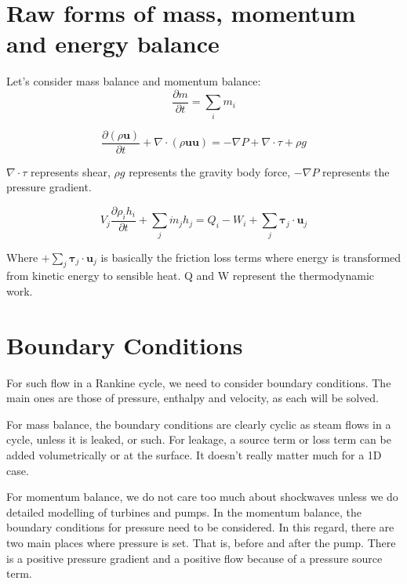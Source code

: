 \documentclass[masters]{ucbthesis}
\renewcommand{\_}{\kern-1.5pt\textunderscore\kern-1.5pt}
\begin{document}
\section{Raw forms of mass, momentum and energy balance}

Let's consider mass balance and momentum balance:
\begin{equation}
	\frac{\partial m}{\partial t} = \sum_i m_i
\end{equation}


\begin{equation}
	\frac{\partial (\rho \textbf{u})}{\partial t} 
	+ \nabla \cdot (\rho \textbf{u} \textbf{u})
	= - \nabla P
	+ \nabla \cdot \tau 
	+ \rho g
\end{equation}

$\nabla \cdot \tau$ represents shear, $\rho g$ represents the gravity 
body force, $- \nabla P$ represents the pressure gradient.

\begin{equation}
	V_j \frac{\partial \rho_i h_i}{\partial t} + \sum_j \dot{m}_j h_j
	= Q_i - W_i 
	+ \sum_j \mathbf{\tau}_j \cdot \mathbf{u}_j
\end{equation}

Where $+ \sum_j \mathbf{\tau}_j \cdot \mathbf{u}_j $ is basically the 
friction loss terms where energy is transformed from kinetic energy 
to sensible heat. Q and W represent the thermodynamic work.

\section{Boundary Conditions}

For such flow in a Rankine cycle, we need to consider boundary conditions.
The main ones are those of pressure, enthalpy and velocity, as each
will be solved.

For mass balance, the boundary conditions are clearly cyclic as steam 
flows in a cycle, unless it is leaked, or such. For leakage, a source 
term or loss term can be added volumetrically or at the surface. It doesn't 
really matter much for a 1D case.

For momentum balance, we do not care too much about shockwaves unless we 
do detailed modelling of turbines and pumps. In the momentum balance, 
the boundary conditions for pressure need to be considered. In this regard,
there are two main places where pressure is set. That is, before and after 
the pump. There is a positive pressure gradient and a positive flow because 
of a pressure source term.
\end{document}
